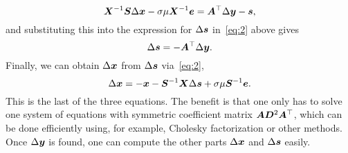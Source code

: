 \documentclass{article}
\begin{document}
\begin{equation*}
 \bm{X}^{-1}\bm{S}\Delta \bm{x}-\sigma \mu \bm{X}^{-1}\bm{e}=\bm{A}^{\top}\Delta \bm{y}-\bm{s},
\end{equation*}
and substituting this into the expression for $\Delta \bm{s}$ in~\eqref{eq:2} above gives
\begin{equation*}
 \Delta \bm{s} = -\bm{A}^{\top} \Delta \bm{y}.
\end{equation*}
Finally, we can obtain $\Delta\bm{x}$ from $\Delta\bm{s}$ via~\eqref{eq:2},
\begin{equation*}
 \Delta\bm{x} = -\bm{x}-\bm{S}^{-1}\bm{X}\Delta \bm{s}+\sigma \mu \bm{S}^{-1}\bm{e}.
\end{equation*}
This is the last of the three equations. The benefit is that one only has to solve one system of equations with symmetric coefficient matrix $\bm{A}\bm{D}^2\bm{A}^{\top}$, which can be done efficiently using, for example, Cholesky factorization or other methods. Once $\Delta\bm{y}$ is found, one can compute the other parts $\Delta\bm{x}$ and $\Delta\bm{s}$ easily.
\end{document}

